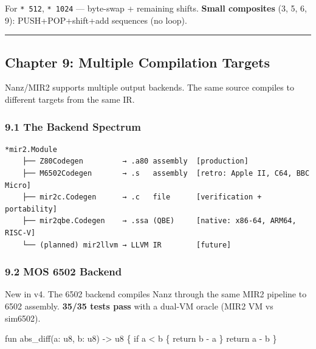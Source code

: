 \documentclass[
  11pt,
  a4paper,
]{report}
\newenvironment{Shaded}{\begin{snugshade}\small}{\end{snugshade}}
\newcommand{\BaseNTok}[1]{\textcolor[rgb]{0.00,0.00,0.81}{#1}}
\newcommand{\BuiltInTok}[1]{#1}
\newcommand{\CommentTok}[1]{\textcolor[rgb]{0.56,0.35,0.01}{\textit{#1}}}
\newcommand{\FunctionTok}[1]{\textcolor[rgb]{0.13,0.29,0.53}{\textbf{#1}}}
\newcommand{\NormalTok}[1]{#1}
\newcommand{\OperatorTok}[1]{\textcolor[rgb]{0.81,0.36,0.00}{\textbf{#1}}}
\begin{document}
For \texttt{*\ 512}, \texttt{*\ 1024} --- byte-swap + remaining shifts.
\textbf{Small composites} (3, 5, 6, 9): PUSH+POP+shift+add sequences (no
loop).

\begin{center}\rule{0.5\linewidth}{0.5pt}\end{center}

\subsection{Chapter 9: Multiple Compilation
Targets}\label{chapter-9-multiple-compilation-targets}

Nanz/MIR2 supports multiple output backends. The same source compiles to
different targets from the same IR.

\subsubsection{9.1 The Backend Spectrum}\label{the-backend-spectrum}

\begin{verbatim}
*mir2.Module
    ├── Z80Codegen         → .a80 assembly  [production]
    ├── M6502Codegen       → .s   assembly  [retro: Apple II, C64, BBC Micro]
    ├── mir2c.Codegen      → .c   file      [verification + portability]
    ├── mir2qbe.Codegen    → .ssa (QBE)     [native: x86-64, ARM64, RISC-V]
    └── (planned) mir2llvm → LLVM IR        [future]
\end{verbatim}

\subsubsection{9.2 MOS 6502 Backend}\label{mos-6502-backend}

New in v4. The 6502 backend compiles Nanz through the same MIR2 pipeline
to 6502 assembly. \textbf{35/35 tests pass} with a dual-VM oracle (MIR2
VM vs sim6502).

\begin{Shaded}
\begin{Highlighting}[]
\NormalTok{fun abs\_diff(a: u8, b: u8) {-}\textgreater{} u8 \{}
\NormalTok{    if a \textless{} b \{ return b {-} a \}}
\NormalTok{    return a {-} b}
\NormalTok{\}}
\end{Highlighting}
\end{Shaded}

\begin{Shaded}
\end{Shaded}
\end{document}
